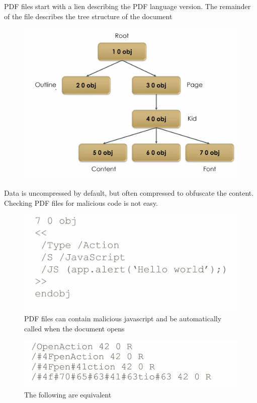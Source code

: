 \documentclass[../notes.tex]{subfiles}
\begin{document}
PDF files start with a lien describing the PDF language version. The remainder of the file describes the tree structure of the document

\begin{figure}[H]
    \centering
    \includegraphics[width=0.8\linewidth]{img/image_2023-04-03-19-29-12.png}
\end{figure}

Data is uncompressed by default, but often compressed to obfuscate the content. Checking PDF files for malicious code is not easy.

\begin{figure}[H]
    \centering
    \includegraphics[width=0.8\linewidth]{img/image_2023-04-03-19-29-42.png}
    \caption{PDF files can contain malicious javascript and be automatically called when the document opens}
\end{figure}


\begin{figure}[H]
    \centering
    \includegraphics[width=0.8\linewidth]{img/image_2023-04-03-19-30-08.png}
    \caption{The following are equivalent}
\end{figure}
\end{document}
